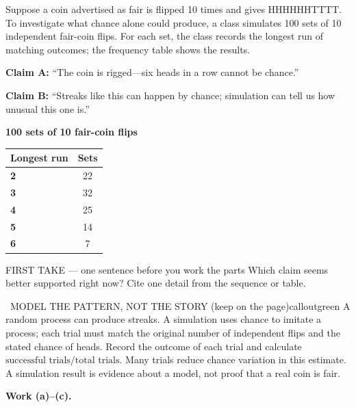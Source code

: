 \documentclass[11pt]{article}
\begin{document}


Suppose a coin advertised as fair is flipped 10 times and gives HHHHHHTTTT. To investigate what chance alone could produce, a class simulates 100 sets of 10 independent fair-coin flips. For each set, the class records the longest run of matching outcomes; the frequency table shows the results.\par\smallskip \textbf{Claim A:} ``The coin is rigged---six heads in a row cannot be chance.''\par \textbf{Claim B:} ``Streaks like this can happen by chance; simulation can tell us how unusual this one is.''\par
\begin{center}
\textbf{100 sets of 10 fair-coin flips}\par\smallskip
\begin{tabular}{|l|c|}
\hline
\textbf{Longest run} & \textbf{Sets} \\ \hline
\textbf{2} & 22 \\ \hline
\textbf{3} & 32 \\ \hline
\textbf{4} & 25 \\ \hline
\textbf{5} & 14 \\ \hline
\textbf{6} & 7 \\ \hline
\end{tabular}
\end{center}
\begin{firsttakebox}{FIRST TAKE --- one sentence before you work the parts}
Which claim seems better supported right now? Cite one detail from the sequence or table.
\workspace{0.9in}
\end{firsttakebox}

\begin{callout}{\IconBook\ MODEL THE PATTERN, NOT THE STORY (keep on the page)}{calloutgreen}
A random process can produce streaks. A simulation uses chance to imitate a process; each trial must match the original number of independent flips and the stated chance of heads. Record the outcome of each trial and calculate $\text{successful trials}/\text{total trials}$. Many trials reduce chance variation in this estimate. A simulation result is evidence about a model, not proof that a real coin is fair.
\end{callout}

\newpage
\textbf{Work (a)--(c).}\par\smallskip
\end{document}
